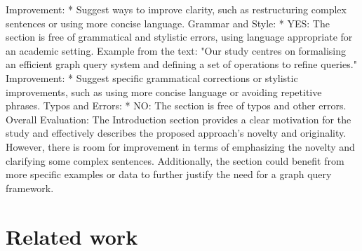 \documentclass{article}%
\begin{document}
\newline%
Improvement:\newline%
\newline%
* Suggest ways to improve clarity, such as restructuring complex sentences or using more concise language.\newline%
\newline%
Grammar and Style:\newline%
\newline%
* YES: The section is free of grammatical and stylistic errors, using language appropriate for an academic setting.\newline%
\newline%
Example from the text: "Our study centres on formalising an efficient graph query system and defining a set of operations to refine queries."\newline%
\newline%
Improvement:\newline%
\newline%
* Suggest specific grammatical corrections or stylistic improvements, such as using more concise language or avoiding repetitive phrases.\newline%
\newline%
Typos and Errors:\newline%
\newline%
* NO: The section is free of typos and other errors.\newline%
\newline%
Overall Evaluation:\newline%
\newline%
The Introduction section provides a clear motivation for the study and effectively describes the proposed approach's novelty and originality. However, there is room for improvement in terms of emphasizing the novelty and clarifying some complex sentences. Additionally, the section could benefit from more specific examples or data to further justify the need for a graph query framework.

%
\clearpage%
\section{Related work}
\label{rw}
\end{document}
